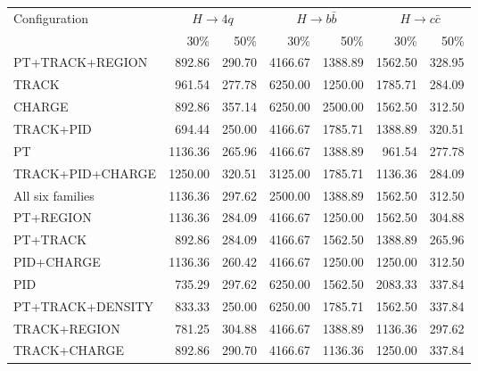 \begin{table}[htbp]
\centering
\footnotesize
\setlength{\tabcolsep}{2.5pt}
\begin{tabularx}{\linewidth}{@{}Xrrrrrr@{}}
\toprule
Configuration & \multicolumn{2}{c}{$H\to4q$} & \multicolumn{2}{c}{$H\to b\bar b$} & \multicolumn{2}{c}{$H\to c\bar c$} \\
\cmidrule(lr){2-3}\cmidrule(lr){4-5}\cmidrule(lr){6-7}
 & 30\% & 50\% & 30\% & 50\% & 30\% & 50\% \\
\midrule
PT+TRACK+REGION & 892.86 & 290.70 & 4166.67 & 1388.89 & 1562.50 & 328.95 \\ %
TRACK & 961.54 & 277.78 & 6250.00 & 1250.00 & 1785.71 & 284.09 \\ %
CHARGE & 892.86 & 357.14 & 6250.00 & 2500.00 & 1562.50 & 312.50 \\ %
TRACK+PID & 694.44 & 250.00 & 4166.67 & 1785.71 & 1388.89 & 320.51 \\ %
PT & 1136.36 & 265.96 & 4166.67 & 1388.89 & 961.54 & 277.78 \\ %
TRACK+PID+CHARGE & 1250.00 & 320.51 & 3125.00 & 1785.71 & 1136.36 & 284.09 \\ %
All six families & 1136.36 & 297.62 & 2500.00 & 1388.89 & 1562.50 & 312.50 \\ %
PT+REGION & 1136.36 & 284.09 & 4166.67 & 1250.00 & 1562.50 & 304.88 \\ %
PT+TRACK & 892.86 & 284.09 & 4166.67 & 1562.50 & 1388.89 & 265.96 \\ %
PID+CHARGE & 1136.36 & 260.42 & 4166.67 & 1250.00 & 1250.00 & 312.50 \\ %
PID & 735.29 & 297.62 & 6250.00 & 1562.50 & 2083.33 & 337.84 \\ %
PT+TRACK+DENSITY & 833.33 & 250.00 & 6250.00 & 1785.71 & 1562.50 & 337.84 \\ %
TRACK+REGION & 781.25 & 304.88 & 4166.67 & 1388.89 & 1136.36 & 297.62 \\ %
TRACK+CHARGE & 892.86 & 290.70 & 4166.67 & 1136.36 & 1250.00 & 337.84 \\ %

\end{tabularx}
\end{table}
